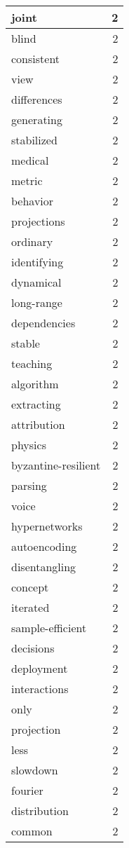 \begin{table}[h]
\begin{tabular}{|l|r|}
\hline
joint & 2 \\
\hline
blind & 2 \\
\hline
consistent & 2 \\
\hline
view & 2 \\
\hline
differences & 2 \\
\hline
generating & 2 \\
\hline
stabilized & 2 \\
\hline
medical & 2 \\
\hline
metric & 2 \\
\hline
behavior & 2 \\
\hline
projections & 2 \\
\hline
ordinary & 2 \\
\hline
identifying & 2 \\
\hline
dynamical & 2 \\
\hline
long-range & 2 \\
\hline
dependencies & 2 \\
\hline
stable & 2 \\
\hline
teaching & 2 \\
\hline
algorithm & 2 \\
\hline
extracting & 2 \\
\hline
attribution & 2 \\
\hline
physics & 2 \\
\hline
byzantine-resilient & 2 \\
\hline
parsing & 2 \\
\hline
voice & 2 \\
\hline
hypernetworks & 2 \\
\hline
autoencoding & 2 \\
\hline
disentangling & 2 \\
\hline
concept & 2 \\
\hline
iterated & 2 \\
\hline
sample-efficient & 2 \\
\hline
decisions & 2 \\
\hline
deployment & 2 \\
\hline
interactions & 2 \\
\hline
only & 2 \\
\hline
projection & 2 \\
\hline
less & 2 \\
\hline
slowdown & 2 \\
\hline
fourier & 2 \\
\hline
distribution & 2 \\
\hline
common & 2 \\

\end{tabular}
\end{table}
